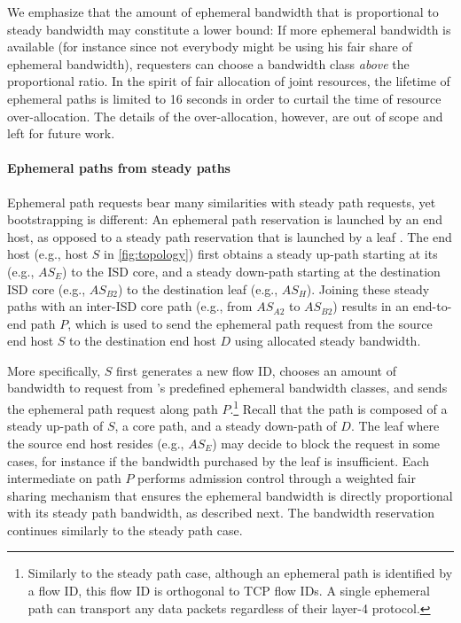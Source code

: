 We emphasize that the amount of ephemeral bandwidth that is proportional to
steady bandwidth may constitute a lower bound: If more ephemeral bandwidth is
available (for instance since not everybody might be using his fair share of
ephemeral bandwidth), requesters can choose a bandwidth class \emph{above} the
proportional ratio. In the spirit of fair allocation of joint resources, the
lifetime of ephemeral paths is limited to 16 seconds in order to curtail the
time of resource over-allocation. The details of the over-allocation, however,
are out of scope and left for future work.

\paragraph{Ephemeral paths from steady paths} Ephemeral path requests bear many
similarities with steady path requests, yet bootstrapping is different: An
ephemeral path reservation is launched by an end host, as opposed to a steady
path reservation that is launched by a leaf \AD. The end host (e.g., host $S$ in
\autoref{fig:topology}) first obtains a steady up-path starting at its \AD
(e.g., $AS_E$) to the ISD core, and a steady down-path starting at the
destination ISD core (e.g., $AS_{B2}$) to the destination leaf \AD (e.g.,
$AS_H$).  Joining these steady paths with an inter-ISD core path (e.g., from
$AS_{A2}$ to $AS_{B2}$) results in an end-to-end path $P$, which is used to
send the ephemeral path request from the source end host $S$ to the destination
end host $D$ using allocated steady bandwidth.

More specifically, $S$ first generates a new flow ID, chooses an amount of
bandwidth to request from \name's predefined ephemeral bandwidth classes, and
sends the ephemeral path request along path $P$.\footnote{Similarly to the
steady path case, although an ephemeral path is identified by a flow ID, this
flow ID is orthogonal to TCP flow IDs. A single ephemeral path can transport any
data packets regardless of their layer-4 protocol.} Recall that the path is
composed of a steady up-path of $S$, a core path, and a steady down-path of
$D$.  The leaf \AD where the source end host resides (e.g., $AS_E$) may decide
to block the request in some cases, for instance if the bandwidth purchased by
the leaf \AD is insufficient. Each intermediate \AD on path $P$ performs admission
control through a weighted fair sharing mechanism that ensures the ephemeral
bandwidth is directly proportional with its steady path bandwidth, as described
next. The bandwidth reservation continues similarly to the steady path case.


